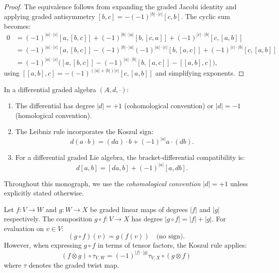 \begin{proof}
The equivalence follows from expanding the graded Jacobi identity and 
applying graded antisymmetry $[b, c] = -(-1)^{|b| \cdot |c|} [c, b]$. 
The cyclic sum becomes:
\begin{align*}
0 &= (-1)^{|a| \cdot |c|} [a, [b, c]] + (-1)^{|b| \cdot |a|} [b, [c, a]] 
    + (-1)^{|c| \cdot |b|} [c, [a, b]] \\
  &= (-1)^{|a| \cdot |c|} [a, [b, c]] 
    - (-1)^{|b| \cdot |a|} (-1)^{|a| \cdot |c|} [b, [a, c]] 
    + (-1)^{|c| \cdot |b|} [c, [a, b]] \\
  &= (-1)^{|a| \cdot |c|} \bigl( [a, [b, c]] - (-1)^{|a| \cdot |b|} [b, [a, c]] 
    - [[a, b], c] \bigr),
\end{align*}
using $[[a,b],c] = -(-1)^{(|a|+|b|)|c|}[c,[a,b]]$ and simplifying exponents.
\end{proof}

\begin{convention}
\label{conv:dg-signs}
In a differential graded algebra $(A, d, \cdot)$:
\begin{enumerate}[label=(\roman*)]
\item The differential has degree $|d| = +1$ (cohomological convention) 
or $|d| = -1$ (homological convention).
\item The Leibniz rule incorporates the Koszul sign:
\[
d(a \cdot b) = (da) \cdot b + (-1)^{|a|} a \cdot (db).
\]
\item For a differential graded Lie algebra, the bracket-differential 
compatibility is:
\[
d[a, b] = [da, b] + (-1)^{|a|} [a, db].
\]
\end{enumerate}
Throughout this monograph, we use the \emph{cohomological convention} 
$|d| = +1$ unless explicitly stated otherwise.
\end{convention}

\begin{lemma}
\label{lem:composition-signs}
Let $f: V \to W$ and $g: W \to X$ be graded linear maps of degrees $|f|$ 
and $|g|$ respectively. The composition $g \circ f: V \to X$ has degree 
$|g \circ f| = |f| + |g|$. For evaluation on $v \in V$:
\[
(g \circ f)(v) = g(f(v)) \quad \text{(no sign)}.
\]
However, when expressing $g \circ f$ in terms of tensor factors, the 
Koszul rule applies:
\[
(f \otimes g) \circ \tau_{V,W} = (-1)^{|f| \cdot |g|} \tau_{V,X} \circ (g \otimes f)
\]
where $\tau$ denotes the graded twist map.
\end{lemma}

